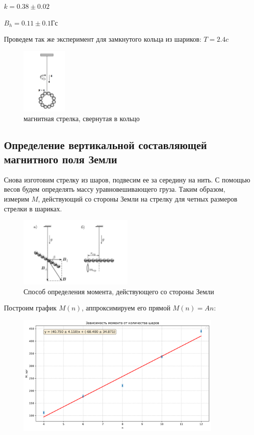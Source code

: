 \documentclass[a4paper, 12pt]{article}
\begin{document}
$k=0.38\pm0.02$

$B_h=0.11\pm0.1\text{Гс}$

Проведем так же эксперимент для замкнутого кольца из шариков: $T=2.4c$

\begin{figure}[h]
  \centering
  \includegraphics[width=0.2\textwidth]{Images/ring.png}
  \caption{магнитная стрелка, свернутая в кольцо}
\end{figure}

\clearpage
\newpage

\subsection{Определение вертикальной составляющей магнитного поля Земли}

Снова изготовим стрелку из шаров, подвесим ее за середину на нить. С помощью весов
будем определять массу уравновешивающего груза. Таким образом, измерим $M$, действующий
со стороны Земли на стрелку для четных размеров стрелки в шариках.

\begin{figure}[h]
  \centering
  \includegraphics[width=0.5\textwidth]{Images/vert.png}
  \caption{Способ определения момента, действующего со стороны Земли}
\end{figure}

Построим график $M(n)$, аппроксимируем его прямой $M(n)=An$:

\begin{figure}[h]
  \centering
  \includegraphics[width=0.9\textwidth]{Images/vertical.png}
\end{figure}
\end{document}
